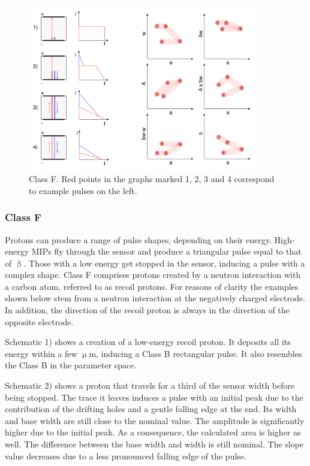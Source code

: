 \clearpage

\begin{figure}[!t]
\centering
\includegraphics[width=0.9\textwidth]{05_current_monitoring/plots/classF}
\caption{Class F. Red points in the graphs marked 1, 2, 3 and 4 correspond to example pulses on the left.}
\label{fig:classf}
\end{figure}

\clearpage
\subsubsection{Class F}
\label{sec:classf}

Protons can produce a range of pulse shapes, depending on their energy. High-energy MIPs fly through the sensor and produce a triangular pulse equal to that of $\upbeta$. Those with a low energy get stopped in the sensor, inducing a pulse with a complex shape. Class F comprises protons created by a neutron interaction with a carbon atom, referred to as recoil protons. For reasons of clarity the examples shown below stem from a neutron interaction at the negatively charged electrode. In addition, the direction of the recoil proton is always in the direction of the opposite electrode.

Schematic 1) shows a creation of a low-energy recoil proton. It deposits all its energy within a few $\upmu$m, inducing a Class B rectangular pulse. It also resembles the Class B in the parameter space.

Schematic 2) shows a proton that travels for a third of the sensor width before being stopped. The trace it leaves induces a pulse with an initial peak due to the contribution of the drifting holes and a gentle falling edge at the end. Its width and base width are still close to the nominal value. The amplitude is significantly higher due to the initial peak. As a consequence, the calculated area is higher as well. The difference between the base width and width is still nominal. The slope value decreases due to a less pronounced falling edge of the pulse.

